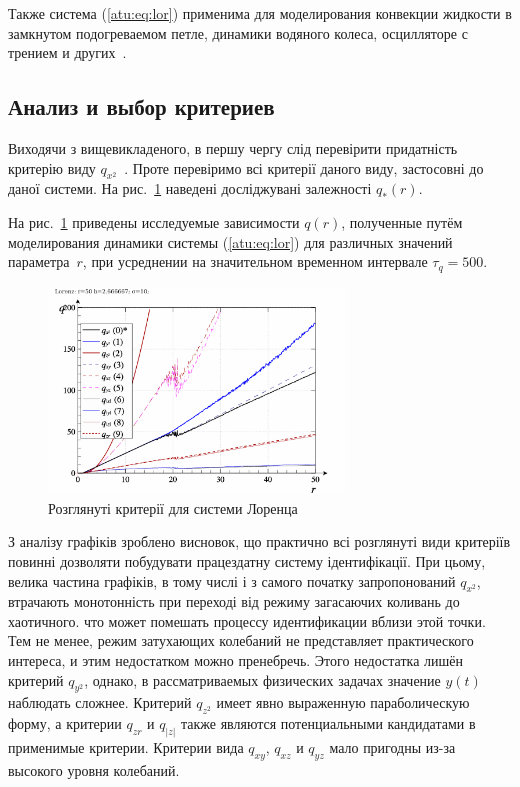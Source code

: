 Также система (\ref{atu:eq:lor}) применима для
моделирования конвекции жидкости в замкнутом подогреваемом петле,
динамики водяного колеса, осцилляторе с трением и других~\cite{kuznetsov_dyn_chaos,atu_arsirii}.



\subsection{Анализ и выбор критериев}  %

Виходячи з вищевикладеного, в першу чергу слід перевірити придатність критерію
виду $q_{x^2}$~\cite{atu_apir2012}. Проте перевіримо всі критерії даного виду, застосовні до
даної системи. На рис.~\ref{atu:f:lor_q} наведені досліджувані залежності
$q_{*}(r)$.

На рис.~\ref{atu:f:lor_q} приведены исследуемые зависимости
$q(r)$, полученные путём моделирования динамики
системы (\ref{atu:eq:lor}) для различных значений параметра~$r$,
при усреднении на значительном временном интервале $\tau_q=500$.


\begin{figure}[ht!]
  \centerline{\includegraphics[width=0.7\textwidth]{p/cha/lor/lor_q-p_q_r.png} }
  \caption{Розглянуті критерії для системи Лоренца}
  \label{atu:f:lor_q}
\end{figure}

З аналізу графіків зроблено висновок, що практично всі розглянуті види
критеріїв повинні дозволяти побудувати працездатну систему ідентифікації. При
цьому, велика частина графіків, в тому числі і з самого початку запропонований
$q_{x^2}$, втрачають монотонність при переході від режиму загасаючих
коливань до хаотичного.
%
что может помешать процессу идентификации вблизи этой точки.
Тем не менее, режим затухающих колебаний не представляет
практического интереса, и этим недостатком можно пренебречь.
Этого недостатка лишён критерий $q_{y^2}$, однако,
в рассматриваемых физических задачах значение
$y(t)$ наблюдать сложнее.
Критерий $q_{z^2}$ имеет явно выраженную параболическую форму,
а критерии $q_{zr}$ и $q_{|z|}$ также являются потенциальными кандидатами
в применимые критерии.
Критерии вида $q_{xy}$, $q_{xz}$ и $q_{yz}$
мало пригодны из-за высокого уровня колебаний.

